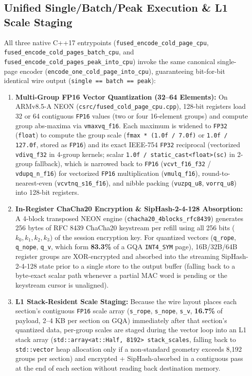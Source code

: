 \documentclass[10pt,twocolumn]{article}
\begin{document}
\subsection{Unified Single/Batch/Peak Execution \& L1 Scale Staging}
All three native C++17 entrypoints (\texttt{fused\_encode\_cold\_page\_cpu}, \texttt{fused\_encode\_cold\_pages\_batch\_cpu}, and \texttt{fused\_encode\_cold\_pages\_peak\_into\_cpu}) invoke the same canonical single-page encoder (\texttt{encode\_one\_cold\_page\_into\_cpu}), guaranteeing bit-for-bit identical wire output (\texttt{single == batch == peak}):
\begin{enumerate}
    \item \textbf{Multi-Group FP16 Vector Quantization (32--64 Elements):} On ARMv8.5-A NEON (\texttt{csrc/fused\_cold\_page\_cpu.cpp}), 128-bit registers load 32 or 64 contiguous \texttt{FP16} values (two or four 16-element groups) and compute group abs-maxima via \texttt{vmaxvq\_f16}. Each maximum is widened to \texttt{FP32} (\texttt{float}) to compute the group scale (\texttt{fmax * (1.0f / 7.0f)} or \texttt{1.0f / 127.0f}, stored as \texttt{FP16}) and its exact IEEE-754 \texttt{FP32} reciprocal (vectorized \texttt{vdivq\_f32} in 4-group kernels; scalar \texttt{1.0f / static\_cast<float>(sc)} in 2-group fallback), which is narrowed back to \texttt{FP16} (\texttt{vcvt\_f16\_f32} / \texttt{vdupq\_n\_f16}) for vectorized \texttt{FP16} multiplication (\texttt{vmulq\_f16}), round-to-nearest-even (\texttt{vcvtnq\_s16\_f16}), and nibble packing (\texttt{vuzpq\_u8}, \texttt{vorrq\_u8}) into 128-bit registers.
    \item \textbf{In-Register ChaCha20 Encryption \& SipHash-2-4-128 Absorption:} A 4-block transposed NEON engine (\texttt{chacha20\_4blocks\_rfc8439}) generates 256 bytes of RFC 8439 ChaCha20 keystream per refill using all 256 bits ($k_0, k_1, k_2, k_3$) of the session encryption key. For quantized vectors (\texttt{q\_rope}, \texttt{q\_nope}, \texttt{q\_v}, which form \textbf{83.3\%} of a GQA \texttt{INT4\_SYM} page), 16B/32B/64B register groups are XOR-encrypted and absorbed into the streaming SipHash-2-4-128 state prior to a single store to the output buffer (falling back to a byte-exact scalar path whenever a partial MAC word is pending or the keystream cursor is unaligned).
    \item \textbf{L1 Stack-Resident Scale Staging:} Because the wire layout places each section's contiguous \texttt{FP16} scale array (\texttt{s\_rope}, \texttt{s\_nope}, \texttt{s\_v}, \textbf{16.7\%} of payload, 2--4 KB per section on GQA) immediately after that section's quantized data, per-group scales are staged during the vector loop into an L1 stack array (\texttt{std::array<at::Half, 8192> stack\_scales}, falling back to \texttt{std::vector} heap allocation only if a non-standard geometry exceeds 8,192 groups per section) and encrypted + SipHash-absorbed in a contiguous pass at the end of each section without reading back destination memory.
\end{enumerate}
\end{document}
